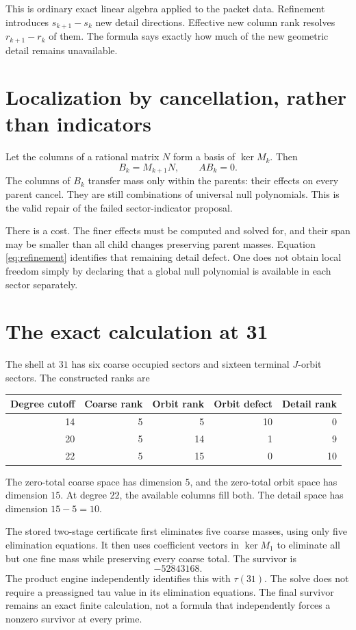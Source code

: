 This is ordinary exact linear algebra applied to the packet data. Refinement introduces $s_{k+1}-s_k$ new detail directions. Effective new column rank resolves $r_{k+1}-r_k$ of them. The formula says exactly how much of the new geometric detail remains unavailable.

\section{Localization by cancellation, rather than indicators}
Let the columns of a rational matrix $N$ form a basis of $\ker M_k$. Then
\begin{equation}\label{eq:detailmatrix}
B_k=M_{k+1}N,\qquad AB_k=0.
\end{equation}
The columns of $B_k$ transfer mass only within the parents: their effects on every parent cancel. They are still combinations of universal null polynomials. This is the valid repair of the failed sector-indicator proposal.

There is a cost. The finer effects must be computed and solved for, and their span may be smaller than all child changes preserving parent masses. Equation \eqref{eq:refinement} identifies that remaining detail defect. One does not obtain local freedom simply by declaring that a global null polynomial is available in each sector separately.

\section{The exact calculation at 31}
The shell at $31$ has six coarse occupied sectors and sixteen terminal $J$-orbit sectors. The constructed ranks are
\begin{center}
\begin{tabular}{rrrrr}
\toprule
Degree cutoff&Coarse rank&Orbit rank&Orbit defect&Detail rank\\
\midrule
14&5&5&10&0\\
20&5&14&1&9\\
22&5&15&0&10\\
\bottomrule
\end{tabular}
\end{center}
The zero-total coarse space has dimension $5$, and the zero-total orbit space has dimension $15$. At degree $22$, the available columns fill both. The detail space has dimension $15-5=10$.

The stored two-stage certificate first eliminates five coarse masses, using only five elimination equations. It then uses coefficient vectors in $\ker M_1$ to eliminate all but one fine mass while preserving every coarse total. The survivor is
\[
-52843168.
\]
The product engine independently identifies this with $\tau(31)$. The solve does not require a preassigned tau value in its elimination equations. The final survivor remains an exact finite calculation, not a formula that independently forces a nonzero survivor at every prime.

